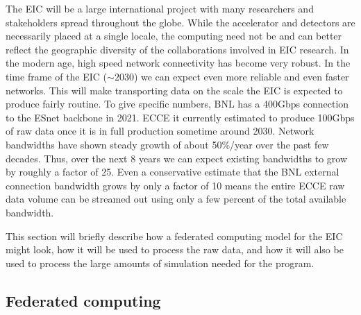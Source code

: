 




The EIC will be a large international project with many researchers and stakeholders spread throughout the globe. While the accelerator and detectors are necessarily placed at a single locale, the computing need not be and can better reflect the geographic diversity of the collaborations involved in EIC research. In the modern age, high speed network connectivity has become very robust. In the time frame of the EIC ($\sim 2030$) we can expect even more reliable and even faster networks. This will make transporting data on the scale the EIC is expected to produce fairly routine. To give specific numbers, BNL has a 400Gbps connection to the ESnet backbone in 2021. ECCE it currently estimated to produce 100Gbps of raw data once it is in full production sometime around 2030. Network bandwidths have shown steady growth of about 50\%/year over the past few decades\cite{nielsensLaw2019}. Thus, over the next 8 years we can expect existing bandwidths to grow by roughly a factor of 25. Even a conservative estimate that the BNL external connection bandwidth grows by only a factor of 10 means the entire ECCE raw data volume can be streamed out using only a few percent of the total available bandwidth.

This section will briefly describe how a federated computing model for the EIC might look, how it will be used to process the raw data, and how it will also be used to process the large amounts of simulation needed for the program.

\subsection{Federated computing}


